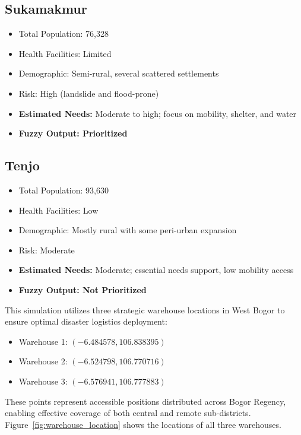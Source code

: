 \documentclass[journal,final,a4paper,twoside,11pt]{IEEEtran}
\begin{document}
\subsection*{Sukamakmur}
\begin{itemize}
    \item Total Population: 76,328
    \item Health Facilities: Limited
    \item Demographic: Semi-rural, several scattered settlements
    \item Risk: High (landslide and flood-prone)
    \item \textbf{Estimated Needs:} Moderate to high; focus on mobility, shelter, and water
    \item \textbf{Fuzzy Output: Prioritized}
\end{itemize}

\subsection*{Tenjo}
\begin{itemize}
    \item Total Population: 93,630
    \item Health Facilities: Low
    \item Demographic: Mostly rural with some peri-urban expansion
    \item Risk: Moderate
    \item \textbf{Estimated Needs:} Moderate; essential needs support, low mobility access
    \item \textbf{Fuzzy Output: Not Prioritized}
\end{itemize}

This simulation utilizes three strategic warehouse locations in West Bogor to ensure optimal disaster logistics deployment:

\begin{itemize}
    \item Warehouse 1: \((-6.484578, 106.838395)\)
    \item Warehouse 2: \((-6.524798, 106.770716)\)
    \item Warehouse 3: \((-6.576941, 106.777883)\)
\end{itemize}

These points represent accessible positions distributed across Bogor Regency, enabling effective coverage of both central and remote sub-districts. Figure~\ref{fig:warehouse_location} shows the locations of all three warehouses. 
\end{document}
